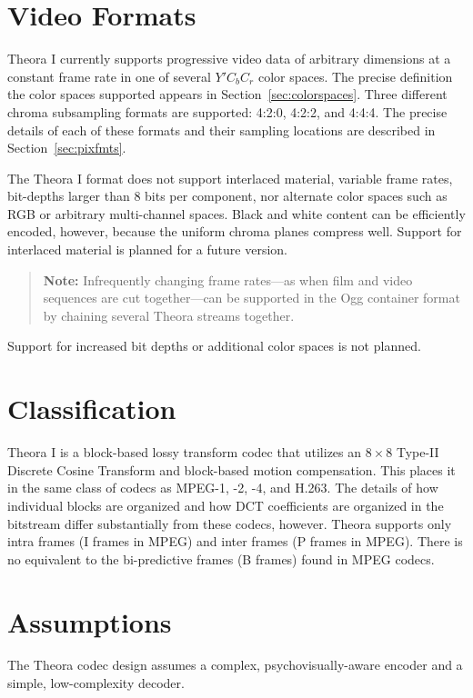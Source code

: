 \documentclass[11pt,letterpaper]{book}
\numberwithin{equation}{chapter}
\numberwithin{figure}{chapter}
\numberwithin{table}{chapter}
\begin{document}
\section{Video Formats}

Theora I currently supports progressive video data of arbitrary dimensions at a
 constant frame rate in one of several $Y'C_bC_r$ color spaces.
The precise definition the color spaces supported appears in
 Section~\ref{sec:colorspaces}.
Three different chroma subsampling formats are supported: 4:2:0, 4:2:2,
 and 4:4:4.
The precise details of each of these formats and their sampling locations are
 described in Section~\ref{sec:pixfmts}.

The Theora I format does not support interlaced material, variable frame rates,
 bit-depths larger than 8 bits per component, nor alternate color spaces such
 as RGB or arbitrary multi-channel spaces.
Black and white content can be efficiently encoded, however, because the
 uniform chroma planes compress well.
Support for interlaced material is planned for a future version.
\begin{verse}
{\bf Note:} Infrequently changing frame rates---as when film and video sequences
 are cut together---can be supported in the Ogg container format by chaining
 several Theora streams together.
\end{verse}
Support for increased bit depths or additional color spaces is not planned.

\section{Classification}

Theora I is a block-based lossy transform codec that utilizes an
 $8\times 8$ Type-II Discrete Cosine Transform and block-based motion
 compensation.
This places it in the same class of codecs as MPEG-1, -2, -4, and H.263.
The details of how individual blocks are organized and how DCT coefficients are
 organized in the bitstream differ substantially from these codecs, however.
Theora supports only intra frames (I frames in MPEG) and inter frames (P frames
 in MPEG).
There is no equivalent to the bi-predictive frames (B frames) found in MPEG
 codecs.

\section{Assumptions}

The Theora codec design assumes a complex, psychovisually-aware encoder and a
 simple, low-complexity decoder.
\end{document}
